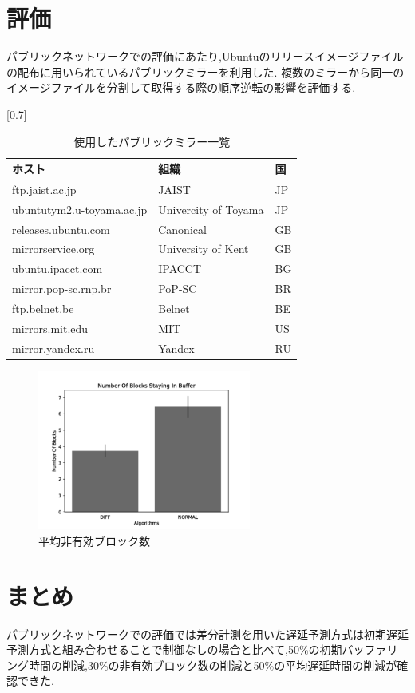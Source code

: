 \documentclass{ltjsarticle}
\begin{document}
\section{評価}
パブリックネットワークでの評価にあたり,Ubuntuのリリースイメージファイルの配布に用いられているパブリックミラー\cite{ubuntu}を利用した.
複数のミラーから同一のイメージファイルを分割して取得する際の順序逆転の影響を評価する.

\begin{table}[htbp]
	\begin{center}
		\caption{使用したパブリックミラー一覧}
		\label{tablemirror}
		\scalebox{0.7}[0.7]{
		\begin{tabular}{|l|l|l|} \hline
			ホスト & 組織 & 国\\ \hline \hline
			ftp.jaist.ac.jp & JAIST & JP \\
			ubuntutym2.u-toyama.ac.jp & Univercity of Toyama & JP \\
			releases.ubuntu.com & Canonical & GB \\
			mirrorservice.org & University of Kent & GB \\
			ubuntu.ipacct.com & IPACCT & BG \\
			mirror.pop-sc.rnp.br & PoP-SC & BR \\
			ftp.belnet.be & Belnet & BE \\
			mirrors.mit.edu & MIT & US \\
			mirror.yandex.ru & Yandex & RU \\ \hline
		\end{tabular}}
	\end{center}
\end{table}

\begin{figure}[ht]
	\centering
	\includegraphics[width=7cm]{figure/nsb-g.pdf}
	\caption{平均非有効ブロック数}
	\label{nsbpub}
\end{figure}

\section{まとめ}
パブリックネットワークでの評価では差分計測を用いた遅延予測方式は初期遅延予測方式と組み合わせることで制御なしの場合と比べて,50\%の初期バッファリング時間の削減,30\%の非有効ブロック数の削減と50\%の平均遅延時間の削減が確認できた.
\end{document}
